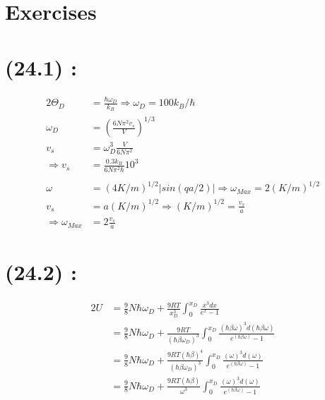 \begin{latin}
   
    \section*{Exercises}
    \section*{(24.1) :}
    \begin{alignat*}{2}
        \Theta_D &= \frac{\hbar \omega_D}{k_B} \Rightarrow \omega_D = 100k_B/\hbar\\
        \omega_D &= (\frac{6N\pi^2 v_s}{V})^{1/3}\\
        v_s &= \omega_D ^3 \frac{V}{6N\pi^2}\\
        \Longrightarrow v_s &= \frac{0.3 k_B }{6N\pi^2 \hbar} 10^{3}\\\\
        \omega &= (4K/m)^{1/2}|sin(qa/2)| \Rightarrow \omega_{Max} = 2(K/m)^{1/2}\\
        v_s &= a(K/m)^{1/2} \Rightarrow (K/m)^{1/2} = \frac{v_s}{a}\\
        \Longrightarrow \omega_{Max} &= 2\frac{v_s}{a}
    \end{alignat*}
    
    \section*{(24.2) :}
    \begin{alignat*}{2}
        U &=  \frac{9}{8} N\hbar \omega_D + \frac{9RT}{x_D^3} \int_0^{x_D}\frac{x^3dx}{e^x - 1}\\
        &=  \frac{9}{8} N\hbar \omega_D + \frac{9RT}{(\hbar \beta \omega_D)^3} \int_0^{x_D}\frac{(\hbar \beta \omega)^3d(\hbar \beta \omega)}{e^{(\hbar \beta \omega)} - 1}\\
        &=  \frac{9}{8} N\hbar \omega_D + \frac{9RT(\hbar \beta)^4}{(\hbar \beta \omega_D)^3} \int_0^{x_D}\frac{(\omega)^3d( \omega)}{e^{(\hbar \beta \omega)} - 1}\\
        &=  \frac{9}{8} N\hbar \omega_D + \frac{9RT(\hbar \beta)}{\omega^3} \int_0^{x_D}\frac{(\omega)^3d( \omega)}{e^{(\hbar \beta \omega)} - 1}
    \end{alignat*}


\end{latin}
